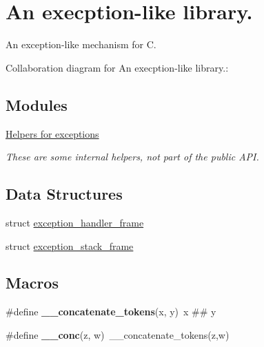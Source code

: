 \hypertarget{group__exceptions}{}\section{An execption-\/like library.}
\label{group__exceptions}


An exception-\/like mechanism for C.  


Collaboration diagram for An execption-\/like library.\+:
\subsection*{Modules}
\begin{DoxyCompactItemize}
\item 
\hyperlink{group__helpers}{Helpers for exceptions}
\begin{DoxyCompactList}\small\item\em These are some internal helpers, not part of the public A\+PI. \end{DoxyCompactList}\end{DoxyCompactItemize}
\subsection*{Data Structures}
\begin{DoxyCompactItemize}
\item 
struct \hyperlink{structexception__handler__frame}{exception\+\_\+handler\+\_\+frame}
\item 
struct \hyperlink{structexception__stack__frame}{exception\+\_\+stack\+\_\+frame}
\end{DoxyCompactItemize}
\subsection*{Macros}
\begin{DoxyCompactItemize}
\item 
\#define {\bfseries \+\_\+\+\_\+concatenate\+\_\+tokens}(x,  y)~x \#\# y\hypertarget{group__exceptions_gadf8cc03bd0ede7f3e5aafa57de5016dd}{}\label{group__exceptions_gadf8cc03bd0ede7f3e5aafa57de5016dd}

\item 
\#define {\bfseries \+\_\+\+\_\+conc}(z,  w)~\+\_\+\+\_\+concatenate\+\_\+tokens(z,w)\hypertarget{group__exceptions_ga0d2e02c74b05d3ff3bfa9eb3dcd891e3}{}\label{group__exceptions_ga0d2e02c74b05d3ff3bfa9eb3dcd891e3}

\end{DoxyCompactItemize}
